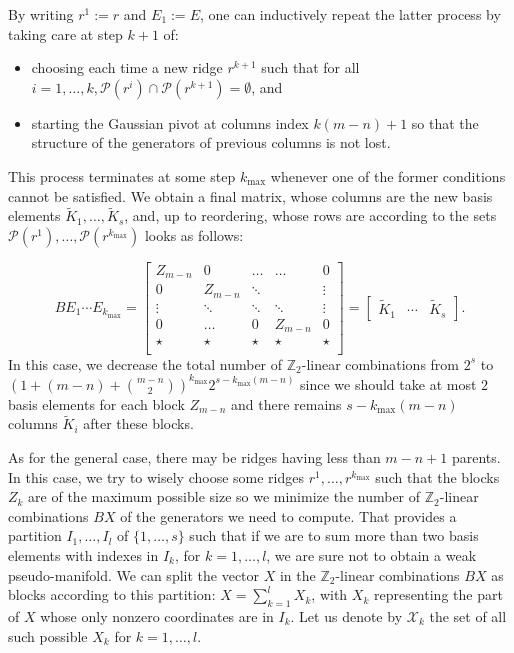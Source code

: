 \documentclass[11pt]{amsart}
\theoremstyle{plain}
\numberwithin{equation}{section}
\theoremstyle{definition}
\newcommand{\cP}{\mathcal{P}}
\newcommand{\cX}{\mathcal{X}}
\newcommand{\Z}{\mathbb{Z}}
\begin{document}
By writing $r^1:=r$ and $E_1:=E$, one can inductively repeat the latter process by taking care at step $k+1$ of:
\begin{itemize}
	\item choosing each time a new ridge $r^{k+1}$ such that for all $i=1,\ldots,k,\cP(r^i)\cap\cP(r^{k+1})=\emptyset$, and
	\item starting the Gaussian pivot at columns index $k(m-n)+1$ so that the structure of the generators of previous columns is not lost.
\end{itemize}
This process terminates at some step $k_{\max}$ whenever one of the former conditions cannot be satisfied.
We obtain a final matrix, whose columns are the new basis elements $\widetilde{K}_1,\ldots,\widetilde{K}_s$, and, up to reordering, whose rows are according to the sets $\cP(r^1),\ldots,\cP(r^{k_{\max}})$ looks as follows:

$$BE_1\cdots E_{k_{\max}} = \begin{bmatrix}
	Z_{m-n}& 0 & \hdots & \hdots & 0 \\
	0 & Z_{m-n} & \ddots &  & \vdots \\
	\vdots & \ddots & \ddots & \ddots & \vdots \\
	0 & \hdots & 0 &Z_{m-n} & 0 \\ \hline
	\star & \star & \star & \star & \star \\
\end{bmatrix} = \begin{bmatrix}
	\widetilde{K}_1&\cdots&\widetilde{K}_s
\end{bmatrix}.$$
In this case, we decrease the total number of $\Z_2$-linear combinations from $2^s$ to $(1+(m-n) + \binom{m-n}{2})^{k_{\max}} 2^{s-k_{\max}(m-n)}$ since we should take at most $2$ basis elements for each block $Z_{m-n}$ and there remains $s-k_{\max}(m-n)$ columns $\widetilde{K}_i$ after these blocks.

As for the general case, there may be ridges having less than $m-n+1$ parents.
In this case, we try to wisely choose some ridges $r^1,\ldots,r^{k_{\max}}$ such that the blocks $Z_k$ are of the maximum possible size so we minimize the number of $\Z_2$-linear combinations $BX$ of the generators we need to compute.
That provides a partition $I_1,\ldots,I_l$ of $\{1,\ldots,s\}$ such that if we are to sum more than two basis elements with indexes in $I_k$, for $k=1,\ldots,l$, we are sure not to obtain a weak pseudo-manifold.
We can split the vector $X$ in the $\Z_2$-linear combinations $BX$ as blocks according to this partition: $X =\sum_{k=1}^l X_k$, with $X_k$ representing the part of $X$ whose only nonzero coordinates are in $I_k$.
Let us denote by $\cX_k$ the set of all such possible $X_k$ for $k=1,\ldots,l$.
\end{document}
